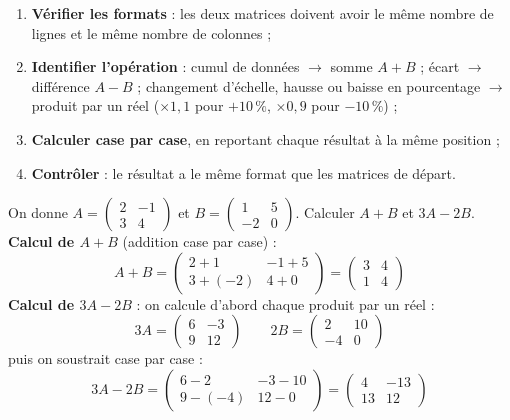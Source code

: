 \documentclass[11pt]{article}
\begin{document}
\begin{methode}
\begin{enumerate}
\item \textbf{Vérifier les formats} : les deux matrices doivent avoir le même nombre de lignes et le même nombre de colonnes ;
\item \textbf{Identifier l'opération} : cumul de données $\rightarrow$ somme $A+B$ ; écart $\rightarrow$ différence $A-B$ ; changement d'échelle, hausse ou baisse en pourcentage $\rightarrow$ produit par un réel ($\times 1{,}1$ pour $+10\,\%$, $\times 0{,}9$ pour $-10\,\%$) ;
\item \textbf{Calculer case par case}, en reportant chaque résultat à la même position ;
\item \textbf{Contrôler} : le résultat a le même format que les matrices de départ.
\end{enumerate}
\end{methode}

\begin{exoresolu}[Calcul de $A+B$ et de $3A - 2B$]
On donne $A = \begin{pmatrix} 2 & -1 \\ 3 & 4 \end{pmatrix}$ et $B = \begin{pmatrix} 1 & 5 \\ -2 & 0 \end{pmatrix}$. Calculer $A + B$ et $3A - 2B$.
\tcblower
\textbf{Calcul de $A+B$} (addition case par case) :
\[ A + B = \begin{pmatrix} 2+1 & -1+5 \\ 3+(-2) & 4+0 \end{pmatrix} = \begin{pmatrix} 3 & 4 \\ 1 & 4 \end{pmatrix} \]
\textbf{Calcul de $3A - 2B$} : on calcule d'abord chaque produit par un réel :
\[ 3A = \begin{pmatrix} 6 & -3 \\ 9 & 12 \end{pmatrix} \qquad 2B = \begin{pmatrix} 2 & 10 \\ -4 & 0 \end{pmatrix} \]
puis on soustrait case par case :
\[ 3A - 2B = \begin{pmatrix} 6-2 & -3-10 \\ 9-(-4) & 12-0 \end{pmatrix} = \begin{pmatrix} 4 & -13 \\ 13 & 12 \end{pmatrix} \]
\end{exoresolu}
\end{document}
